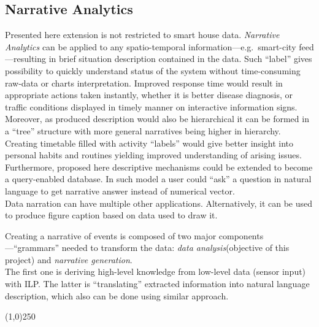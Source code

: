 \documentclass[12pt, a4paper, pdflatex, leqno, twoside, openright]{report}
\begin{document}
    \subsection{Narrative Analytics}
Presented here extension is not restricted to smart house data. \emph{Narrative Analytics} can be applied to any spatio-temporal information---e.g.\ smart-city feed---resulting in brief situation description contained in the data. Such ``label'' gives possibility to quickly understand status of the system without time-consuming raw-data or charts interpretation. Improved response time would result in appropriate actions taken instantly, whether it is better disease diagnosis, or traffic conditions displayed in timely manner on interactive information signs.\\
Moreover, as produced description would also be hierarchical it can be formed in a ``tree'' structure with more general narratives being higher in hierarchy. Creating timetable filled with activity ``labels'' would give better insight into personal habits and routines yielding improved understanding of arising issues.\\
Furthermore, proposed here descriptive mechanisms could be extended to become a query-enabled database. In such model a user could ``ask'' a question in natural language to get narrative answer instead of numerical vector.\\

Data narration can have multiple other applications. Alternatively, it can be used to produce figure caption based on data used to draw it.

Creating a narrative of events is composed of two major components---``grammars'' needed to transform the data: \emph{data analysis}(objective of this project) and \emph{narrative generation}.\\
The first one is deriving high-level knowledge from low-level data (sensor input) with ILP. The latter is ``translating'' extracted information into natural language description, which also can be done using similar approach.


\begin{center}
\noindent \line(1,0){250}
\end{center}

{}

% 
\end{document}
